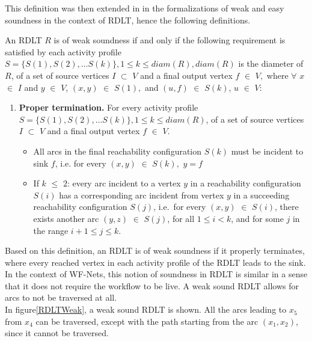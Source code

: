 This definition was then extended in\cite{Ramirez2024} in the formalizations of weak and easy soundness in the context of RDLT, hence the following definitions.

\begin{defn} 
    \label{WeakRDLTDef}
    An RDLT $ R $ is of weak soundness if and only if the following requirement is satisfied by each activity profile $ S = \{S(1), S(2), \ldots S(k)\}, 1 \leq k \leq diam(R), diam(R) $ is the diameter of $ R $, of a set of source vertices $ I $ $ \subset $ $ V $ and a final output vertex $ f $ $ \in $ $ V, $ where $ \forall $ $ x $ $ \in $ $ I $ and $ y $ $ \in $ $ V $, $ (x,y) $ $ \in $ $ S(1), $ and $ (u,f) $ $ \in $ $ S(k) $, $ u $ $ \in $ $ V $:
    \begin{enumerate}
        \item \textbf{Proper termination.} For every activity profile $ S = \{S(1), S(2), \ldots S(k)\}, 1 \leq k \leq diam(R) $, of a set of source vertices $ I $ $ \subset $ $ V $ and a final output vertex $ f $ $ \in $ $ V $.
        \begin{itemize}
            \item All arcs in the final reachability configuration $ S(k) $ must be incident to sink $ f $, i.e. for every $ (x,y) $ $ \in $ $ S(k), $ $ y = f $
            \item If $ k $ $ \leq $ $ 2 $: every arc incident to a vertex $ y $ in a reachability configuration $ S(i) $ has a corresponding arc incident from vertex $ y $ in a succeeding reachability configuration $ S(j) $, i.e.\ for every $ (x,y) $ $ \in $ $ S(i) $, there exists another arc $ (y,z) $ $ \in $ $ S(j) $, for all $ 1 \leq i < k $, and for some $ j $ in the range $ i + 1 \leq j \leq k $.
        \end{itemize}
    \end{enumerate}
\end{defn}
Based on this definition, an RDLT is of weak soundness if it properly terminates, where every reached vertex in each activity profile of the RDLT leads to the sink. In the context of WF-Nets, this notion of soundness in RDLT is similar in a sense that it does not require the workflow to be live. A weak sound RDLT allows for arcs to not be traversed at all. \\
In figure\ref{RDLTWeak}, a weak sound RDLT is shown. All the arcs leading to $x_5$ from $x_4$ can be traversed, except with the path starting from the arc $(x_1, x_2)$, since it cannot be traversed.
